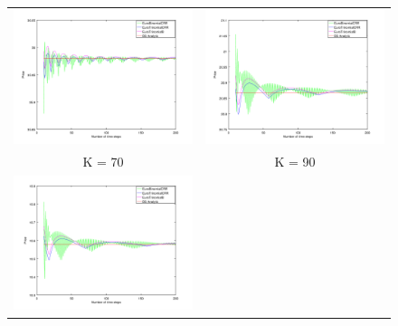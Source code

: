 \documentclass[12pt,a4paper,hidelinks,fleqn]{article}            %
\begin{document}
\begin{figure}
\begin{tabular}{cc}
\includegraphics[scale=0.4]{ex2_70} &
\includegraphics[scale=0.4]{ex2_90} \\
K = 70 & K = 90 \\
\includegraphics[scale=0.4]{ex2_110} &

\end{tabular}
\end{figure}
\end{document}
